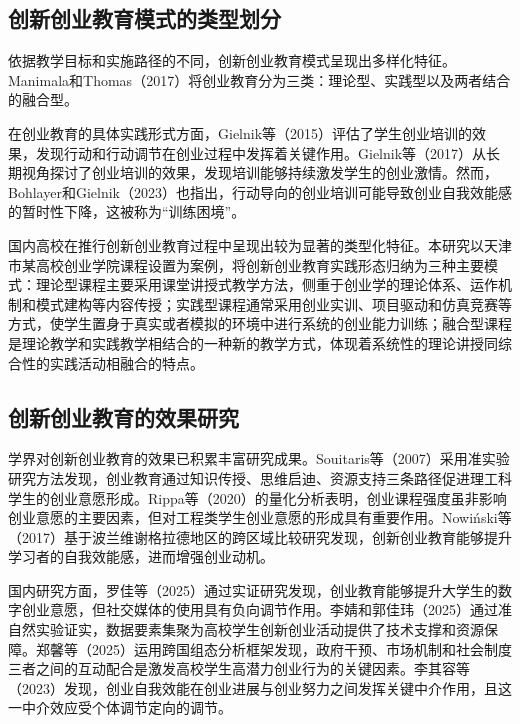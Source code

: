 \subsection{创新创业教育模式的类型划分}

依据教学目标和实施路径的不同，创新创业教育模式呈现出多样化特征。Manimala和Thomas\nolinebreak[3]（2017）将创业教育分为三类：理论型、实践型以及两者结合的融合型\cite{Manimala2017}。

在创业教育的具体实践形式方面，Gielnik等\nolinebreak[3]（2015）评估了学生创业培训的效果，发现行动和行动调节在创业过程中发挥着关键作用\cite{Gielnik2015}。Gielnik等\nolinebreak[3]（2017）从长期视角探讨了创业培训的效果，发现培训能够持续激发学生的创业激情\cite{Gielnik2017}。然而，Bohlayer和Gielnik\nolinebreak[3]（2023）也指出，行动导向的创业培训可能导致创业自我效能感的暂时性下降，这被称为\nolinebreak[3]“训练困境”\cite{Bohlayer2023}。

国内高校在推行创新创业教育过程中呈现出较为显著的类型化特征。本研究以天津市某高校创业学院课程设置为案例，将创新创业教育实践形态归纳为三种主要模式：理论型课程主要采用课堂讲授式教学方法，侧重于创业学的理论体系、运作机制和模式建构等内容传授；实践型课程通常采用创业实训、项目驱动和仿真竞赛等方式，使学生置身于真实或者模拟的环境中进行系统的创业能力训练；融合型课程是理论教学和实践教学相结合的一种新的教学方式，体现着系统性的理论讲授同综合性的实践活动相融合的特点。

\subsection{创新创业教育的效果研究}

学界对创新创业教育的效果已积累丰富研究成果。Souitaris等\nolinebreak[3]（2007）采用准实验研究方法发现，创业教育通过知识传授、思维启迪、资源支持三条路径促进理工科学生的创业意愿形成\cite{Souitaris2007}。Rippa等\nolinebreak[3]（2020）的量化分析表明，创业课程强度虽非影响创业意愿的主要因素，但对工程类学生创业意愿的形成具有重要作用\cite{Rippa2020}。Nowiński等\nolinebreak[3]（2017）基于波兰维谢格拉德地区的跨区域比较研究发现，创新创业教育能够提升学习者的自我效能感，进而增强创业动机\cite{Nowinski2017}。

国内研究方面，罗佳等\nolinebreak[3]（2025）通过实证研究发现，创业教育能够提升大学生的数字创业意愿，但社交媒体的使用具有负向调节作用\cite{luojia2025}。李婧和郭佳玮\nolinebreak[3]（2025）通过准自然实验证实，数据要素集聚为高校学生创新创业活动提供了技术支撑和资源保障\cite{lijing2025}。郑馨等\nolinebreak[3]（2025）运用跨国组态分析框架发现，政府干预、市场机制和社会制度三者之间的互动配合是激发高校学生高潜力创业行为的关键因素\cite{zhengxin2025}。李其容等\nolinebreak[3]（2023）发现，创业自我效能在创业进展与创业努力之间发挥关键中介作用，且这一中介效应受个体调节定向的调节\cite{liqirong2023}。

